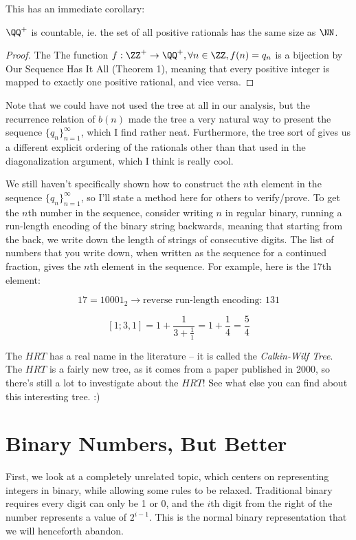 \documentclass[12pt]{scrartcl}
\begin{document}
This has an immediate corollary:
\begin{corollary}
	$\QQ^+$ is countable, ie. the set of all positive rationals has the same size as $\NN$.
\end{corollary}
\begin{proof}
	The
	The function $f: \ZZ^+ \rightarrow \QQ^+, \forall n \in \ZZ, f(n) = q_n$ is a bijection by Our Sequence Has It All (Theorem 1), meaning that every positive integer is mapped to exactly one positive rational, and vice versa.
\end{proof}

Note that we could have not used the tree at all in our analysis, but  the recurrence relation of $b(n)$ made the tree a very natural way to present the sequence $\{q_n\}_{n=1}^\infty$, which I find rather neat. Furthermore, the tree sort of gives us a different explicit ordering of the rationals other than that used in the diagonalization argument, which I think is really cool.

We still haven't specifically shown how to construct the $n$th element in the sequence $\{q_n\}_{n=1}^\infty$, so I'll state a method here for others to verify/prove. To get the $n$th number in the sequence, consider writing $n$ in regular binary, running a run-length encoding of the binary string backwards, meaning that starting from the back, we write down the length of strings of consecutive digits. The list of numbers that you write down, when written as the sequence for a continued fraction, gives the $n$th element in the sequence. For example, here is the 17th element:

\[
	17 = 10001_2 \rightarrow \text{reverse run-length encoding: } 131
\]

\[
	[1; 3, 1] = 1 + \frac{1}{3 + \frac{1}{1}} = 1 + \frac{1}{4} =  \frac{5}{4}
\]

The $HRT$ has a real name in the literature -- it is called the \textit{Calkin-Wilf Tree}. The $HRT$ is a fairly new tree, as it comes from a paper published in 2000, so there's still a lot to investigate about the $HRT$! See what else you can find about this interesting tree. :)


\section{Binary Numbers, But Better}
First, we look at a completely unrelated topic, which centers on representing integers in binary, while allowing some rules to be relaxed. Traditional binary requires every digit can only be 1 or 0, and the $i$th digit from the right of the number represents a value of $2^{i-1}$. This is the normal binary representation that we will henceforth abandon.
\end{document}
